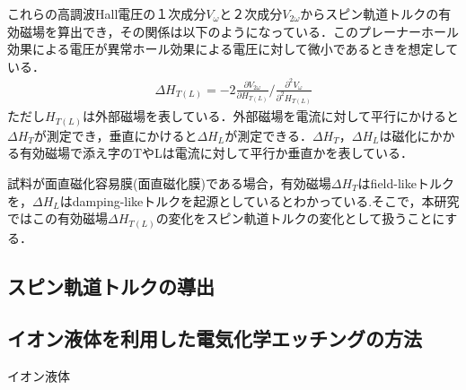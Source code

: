 これらの高調波Hall電圧の１次成分$V_{\omega}$と２次成分$V_{2\omega}$からスピン軌道トルクの有効磁場を算出でき，その関係は以下のようになっている\cite{yang2015layer,kim2013layer}．このプレーナーホール効果による電圧が異常ホール効果による電圧に対して微小であるときを想定している．
\begin{eqnarray}
\Delta H_{T(L)}=-2\frac{\partial V_{2\omega}}{\partial H_{T(L)}}\biggl/\frac{\partial^{2} V_{\omega}}{\partial^{2} H_{T(L)}}
\label{eq:torque}
\end{eqnarray}
ただし$H_{T(L)}$は外部磁場を表している．外部磁場を電流に対して平行にかけると$\Delta H_{T}$が測定でき，垂直にかけると$\Delta H_{L}$が測定できる．$\Delta H_{T}$，$\Delta H_{L}$は磁化にかかる有効磁場で添え字のTやLは電流に対して平行か垂直かを表している．

試料が面直磁化容易膜(面直磁化膜)である場合，有効磁場$\Delta H_{T}$はfield-likeトルクを，$\Delta H_{L}$はdamping-likeトルクを起源としているとわかっている\cite{yang2015layer}.そこで，本研究ではこの有効磁場$\Delta H_{T(L)}$の変化をスピン軌道トルクの変化として扱うことにする．

\subsection{スピン軌道トルクの導出}













\subsection{イオン液体を利用した電気化学エッチングの方法}

イオン液体


